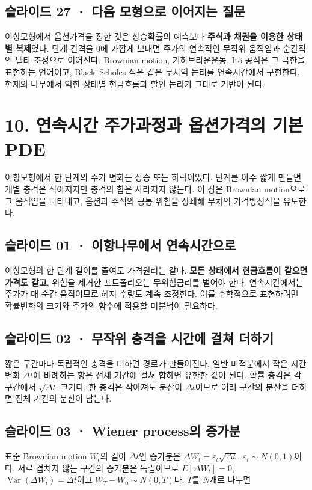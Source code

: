 \documentclass[11pt,a4paper]{article}
\begin{document}
\subsection{슬라이드 27 · 다음 모형으로 이어지는 질문}
이항모형에서 옵션가격을 정한 것은 상승확률의 예측보다 \textbf{주식과 채권을 이용한 상태별 복제}였다. 단계 간격을 0에 가깝게 보내면 주가의 연속적인 무작위 움직임과 순간적인 델타 조정으로 이어진다. Brownian motion, 기하브라운운동, Itô 공식은 그 극한을 표현하는 언어이고, Black–Scholes 식은 같은 무차익 논리를 연속시간에서 구현한다. 현재의 나무에서 익힌 상태별 현금흐름과 할인 논리가 그대로 기반이 된다.\par

\section{10. 연속시간 주가과정과 옵션가격의 기본 PDE}
이항모형에서 한 단계의 주가 변화는 상승 또는 하락이었다. 단계를 아주 짧게 만들면 개별 충격은 작아지지만 충격의 합은 사라지지 않는다. 이 장은 Brownian motion으로 그 움직임을 나타내고, 옵션과 주식의 공통 위험을 상쇄해 무차익 가격방정식을 유도한다.\par

\subsection{슬라이드 01 · 이항나무에서 연속시간으로}
이항모형의 한 단계 길이를 줄여도 가격원리는 같다. \textbf{모든 상태에서 현금흐름이 같으면 가격도 같고}, 위험을 제거한 포트폴리오는 무위험금리를 벌어야 한다. 연속시간에서는 주가가 매 순간 움직이므로 헤지 수량도 계속 조정한다. 이를 수학적으로 표현하려면 확률변화의 크기와 주가의 함수에 적용할 미분법이 필요하다.\par

\subsection{슬라이드 02 · 무작위 충격을 시간에 걸쳐 더하기}
짧은 구간마다 독립적인 충격을 더하면 경로가 만들어진다. 일반 미적분에서 작은 시간 변화 $\Delta t$에 비례하는 항은 전체 기간에 걸쳐 합하면 유한한 값이 된다. 확률 충격은 각 구간에서 $\sqrt{\Delta t}$ 크기다. 한 충격은 작아져도 분산이 $\Delta t$이므로 여러 구간의 분산을 더하면 전체 기간의 분산이 남는다.\par

\subsection{슬라이드 03 · Wiener process의 증가분}
표준 Brownian motion $W_t$의 길이 $\Delta t$인 증가분은 $\Delta W_t=\varepsilon_t\sqrt{\Delta t}$, $\varepsilon_t\sim N(0,1)$이다. 서로 겹치지 않는 구간의 증가분은 독립이므로 $E[\Delta W_t]=0$, $\operatorname{Var}(\Delta W_t)=\Delta t$이고 $W_T-W_0\sim N(0,T)$다. $T$를 $N$개로 나누면\par
\end{document}
